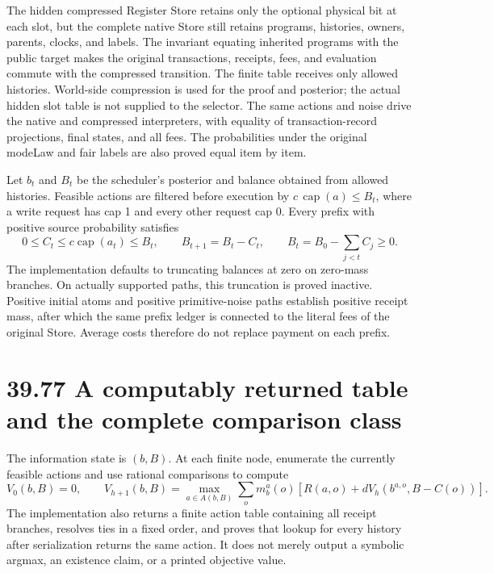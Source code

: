 \documentclass[
  english,
  11pt,
  oneside]{book}
\begin{document}
The hidden compressed Register Store retains only the optional physical bit at each slot, but the complete native Store still retains programs, histories, owners, parents, clocks, and labels. The invariant equating inherited programs with the public target makes the original transactions, receipts, fees, and evaluation commute with the compressed transition. The finite table receives only allowed histories. World-side compression is used for the proof and posterior; the actual hidden slot table is not supplied to the selector. The same actions and noise drive the native and compressed interpreters, with equality of transaction-record projections, final states, and all fees. The probabilities under the original modeLaw and fair labels are also proved equal item by item.

Let \(b_t\) and \(B_t\) be the scheduler's posterior and balance obtained from allowed histories. Feasible actions are filtered before execution by \(c\,\operatorname{cap}(a)\le B_t\), where a write request has cap 1 and every other request cap 0. Every prefix with positive source probability satisfies \[0\le C_t\le c\operatorname{cap}(a_t)\le B_t,
\qquad B_{t+1}=B_t-C_t,
\qquad B_t=B_0-\sum_{j<t}C_j\ge0.\] The implementation defaults to truncating balances at zero on zero-mass branches. On actually supported paths, this truncation is proved inactive. Positive initial atoms and positive primitive-noise paths establish positive receipt mass, after which the same prefix ledger is connected to the literal fees of the original Store. Average costs therefore do not replace payment on each prefix.

\section{39.77 A computably returned table and the complete comparison class}\label{a-computably-returned-table-and-the-complete-comparison-class}

The information state is \((b,B)\). At each finite node, enumerate the currently feasible actions and use rational comparisons to compute \[V_0(b,B)=0,\qquad
V_{h+1}(b,B)=\max_{a\in A(b,B)}
\sum_o m_b^a(o)\left[R(a,o)+dV_h(b^{a,o},B-C(o))\right].\] The implementation also returns a finite action table containing all receipt branches, resolves ties in a fixed order, and proves that lookup for every history after serialization returns the same action. It does not merely output a symbolic argmax, an existence claim, or a printed objective value.
\end{document}
